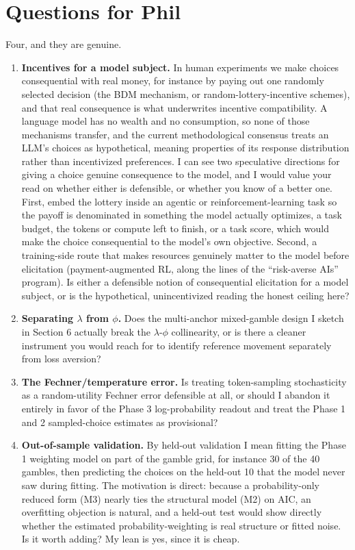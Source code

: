 \documentclass[11pt]{article}
\begin{document}
\section{Questions for Phil}

Four, and they are genuine.

\begin{enumerate}[leftmargin=1.5em]
\item \textbf{Incentives for a model subject.} In human experiments we make choices consequential
with real money, for instance by paying out one randomly selected decision (the BDM mechanism, or
random-lottery-incentive schemes), and that real consequence is what underwrites incentive
compatibility. A language model has no wealth and no consumption, so none of those mechanisms
transfer, and the current methodological consensus treats an LLM's choices as hypothetical, meaning
properties of its response distribution rather than incentivized preferences. I can see two
speculative directions for giving a choice genuine consequence to the model, and I would value your
read on whether either is defensible, or whether you know of a better one. First, embed the lottery
inside an agentic or reinforcement-learning task so the payoff is denominated in something the model
actually optimizes, a task budget, the tokens or compute left to finish, or a task score, which
would make the choice consequential to the model's own objective. Second, a training-side route that
makes resources genuinely matter to the model before elicitation (payment-augmented RL, along the
lines of the ``risk-averse AIs'' program). Is either a defensible notion of consequential
elicitation for a model subject, or is the hypothetical, unincentivized reading the honest ceiling
here?
\item \textbf{Separating $\lambda$ from $\phi$.} Does the multi-anchor mixed-gamble design I sketch
in Section 6 actually break the $\lambda$-$\phi$ collinearity, or is there a cleaner instrument you
would reach for to identify reference movement separately from loss aversion?
\item \textbf{The Fechner/temperature error.} Is treating token-sampling stochasticity as a
random-utility Fechner error defensible at all, or should I abandon it entirely in favor of the
Phase 3 log-probability readout and treat the Phase 1 and 2 sampled-choice estimates as provisional?
\item \textbf{Out-of-sample validation.} By held-out validation I mean fitting the Phase 1
weighting model on part of the gamble grid, for instance 30 of the 40 gambles, then predicting the
choices on the held-out 10 that the model never saw during fitting. The motivation is direct:
because a probability-only reduced form (M3) nearly ties the structural model (M2) on AIC, an
overfitting objection is natural, and a held-out test would show directly whether the estimated
probability-weighting is real structure or fitted noise. Is it worth adding? My lean is yes, since
it is cheap.
\end{enumerate}
\end{document}
